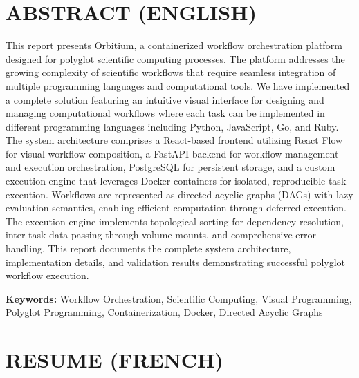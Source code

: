 \documentclass[12pt]{article}
\begin{document}
\newpage
\tableofcontents

\newpage
\listoftables
{}

\newpage
\listoffigures
{}

\newpage
\section*{ABSTRACT (ENGLISH)}

This report presents Orbitium, a containerized workflow orchestration platform designed for polyglot scientific computing processes. The platform addresses the growing complexity of scientific workflows that require seamless integration of multiple programming languages and computational tools. We have implemented a complete solution featuring an intuitive visual interface for designing and managing computational workflows where each task can be implemented in different programming languages including Python, JavaScript, Go, and Ruby. The system architecture comprises a React-based frontend utilizing React Flow for visual workflow composition, a FastAPI backend for workflow management and execution orchestration, PostgreSQL for persistent storage, and a custom execution engine that leverages Docker containers for isolated, reproducible task execution. Workflows are represented as directed acyclic graphs (DAGs) with lazy evaluation semantics, enabling efficient computation through deferred execution. The execution engine implements topological sorting for dependency resolution, inter-task data passing through volume mounts, and comprehensive error handling. This report documents the complete system architecture, implementation details, and validation results demonstrating successful polyglot workflow execution.

\vspace{1cm}

\noindent
\textbf{Keywords:} Workflow Orchestration, Scientific Computing, Visual Programming, Polyglot Programming, Containerization, Docker, Directed Acyclic Graphs

\vspace{2cm}

\section*{RESUME (FRENCH)}
\end{document}

